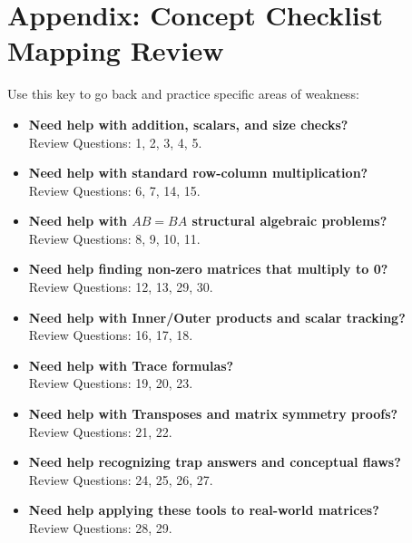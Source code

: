 \documentclass[11pt]{article}
\begin{document}
\newpage
\section{Appendix: Concept Checklist Mapping Review}
Use this key to go back and practice specific areas of weakness:

\begin{itemize}
    \item \textbf{Need help with addition, scalars, and size checks?} \\ Review Questions: 1, 2, 3, 4, 5.
    \item \textbf{Need help with standard row-column multiplication?} \\ Review Questions: 6, 7, 14, 15.
    \item \textbf{Need help with $AB=BA$ structural algebraic problems?} \\ Review Questions: 8, 9, 10, 11.
    \item \textbf{Need help finding non-zero matrices that multiply to 0?} \\ Review Questions: 12, 13, 29, 30.
    \item \textbf{Need help with Inner/Outer products and scalar tracking?} \\ Review Questions: 16, 17, 18.
    \item \textbf{Need help with Trace formulas?} \\ Review Questions: 19, 20, 23.
    \item \textbf{Need help with Transposes and matrix symmetry proofs?} \\ Review Questions: 21, 22.
    \item \textbf{Need help recognizing trap answers and conceptual flaws?} \\ Review Questions: 24, 25, 26, 27.
    \item \textbf{Need help applying these tools to real-world matrices?} \\ Review Questions: 28, 29.
\end{itemize}
\end{document}
